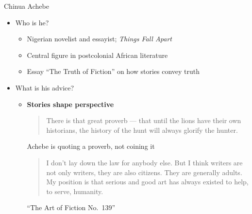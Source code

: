 \documentclass[aspectratio=169]{beamer}
\begin{document}
\begin{frame}{Chinua Achebe}
  \begin{itemize}
  \item Who is he?
    \begin{itemize}
    \item Nigerian novelist and essayist; \emph{Things Fall Apart}
    \item Central figure in postcolonial African literature
    \item Essay ``The Truth of Fiction'' on how stories convey truth \citep{achebe:truth-of-fiction}
    \end{itemize}
  \item What is his advice?
    \begin{itemize}
    \item \textbf{Stories shape perspective}\\
 \begin{quote}
    There is that great proverb --- that until the lions have their own
    historians, the history of the hunt will always glorify the hunter.
 \end{quote}
 \hfill {\footnotesize Achebe is quoting a proverb, not coining it \citep{Achebe:1994}}
\vspace{2ex}
 \begin{quote}
I don’t lay down the law for anybody else. But I think writers are not only writers, they are also citizens. They are generally adults. My position is that serious and good art has always existed to help, to serve, humanity.
\end{quote}
  ``The Art of Fiction No.~139''
   \citep{Achebe:1994}
\end{itemize}
  \end{itemize}
\end{frame}
\end{document}

